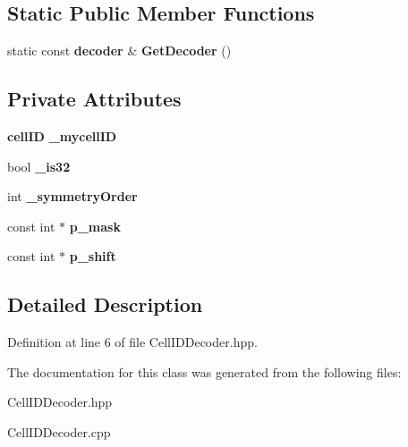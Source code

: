 \subsection*{Static Public Member Functions}
\begin{DoxyCompactItemize}
\item 
static const {\bf decoder} \& {\bfseries Get\-Decoder} ()\label{classCellIDDecoder_af27dfed8b6ba27ad29070cc709cd1dc2}

\end{DoxyCompactItemize}
\subsection*{Private Attributes}
\begin{DoxyCompactItemize}
\item 
{\bf cell\-I\-D} {\bfseries \-\_\-mycell\-I\-D}\label{classCellIDDecoder_a80eb4e813fdba53afd6eabe36881be62}

\item 
bool {\bfseries \-\_\-is32}\label{classCellIDDecoder_a562e6de1c58e67548ab7aae2b3ab6371}

\item 
int {\bfseries \-\_\-symmetry\-Order}\label{classCellIDDecoder_a60d27aa7ada2fb0cdb35357803924f2c}

\item 
const int $\ast$ {\bfseries p\-\_\-mask}\label{classCellIDDecoder_a22de1f2756130010bd9a3aa55516cc5f}

\item 
const int $\ast$ {\bfseries p\-\_\-shift}\label{classCellIDDecoder_aa5c90c05a46e982aba9e50082239f2fc}

\end{DoxyCompactItemize}


\subsection{Detailed Description}


Definition at line 6 of file Cell\-I\-D\-Decoder.\-hpp.



The documentation for this class was generated from the following files\-:\begin{DoxyCompactItemize}
\item 
Cell\-I\-D\-Decoder.\-hpp\item 
Cell\-I\-D\-Decoder.\-cpp\end{DoxyCompactItemize}
